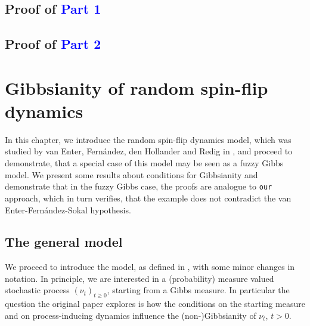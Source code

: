 \documentclass[12pt]{article}
\newcommand{\1}{\mathbbm{1}}
\newcommand{\5}{\vspace{0.5cm}}
\theoremstyle{definition}
\begin{document}

\subsection{Proof of \textcolor{blue}{Part 1}}


\subsection{Proof of \textcolor{blue}{Part 2}}


\pagebreak


\section{Gibbsianity of random spin-flip dynamics}\label{ch:4}

In this chapter, we introduce the random spin-flip dynamics model, which was studied by van Enter, Fern\'andez, den Hollander and Redig in \cite{EFHR}, and proceed to demonstrate, that a special case of this model may be seen as a fuzzy Gibbs model. We present some results about conditions for Gibbsianity and demonstrate that in the fuzzy Gibbs case, the proofs are analogue to \texttt{our} approach, which in turn verifies, that the example does not contradict the van Enter-Fern\'andez-Sokal hypothesis.


\subsection{The general model}

We proceed to introduce the model, as defined in \cite{EFHR}, with some minor changes in notation. In principle, we are interested in a (probability) measure valued stochastic process $(\nu_t)_{t\geq 0}$, starting from a Gibbs measure. In particular the question the original paper explores is how the conditions on the starting measure and on process-inducing dynamics influence the (non-)Gibbsianity of $\nu_t$, $t>0$. \\
\end{document}
